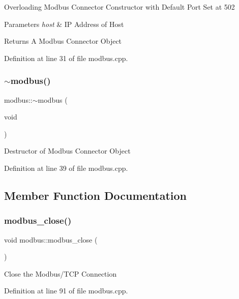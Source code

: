 Overloading Modbus Connector Constructor with Default Port Set at 502 
\begin{DoxyParams}{Parameters}
{\em host} & IP Address of Host \\
\hline
\end{DoxyParams}
\begin{DoxyReturn}{Returns}
A Modbus Connector Object 
\end{DoxyReturn}


Definition at line 31 of file modbus.\+cpp.

\mbox{\label{classmodbus_a28daaab3b7a8c838636c639d2eb14e4f}} 
\subsubsection{\texorpdfstring{$\sim$modbus()}{~modbus()}}
{\footnotesize\ttfamily modbus\+::$\sim$modbus (\begin{DoxyParamCaption}\item[{void}]{ }\end{DoxyParamCaption})}

Destructor of Modbus Connector Object 

Definition at line 39 of file modbus.\+cpp.



\subsection{Member Function Documentation}
\mbox{\label{classmodbus_a9b0db97f942a083431b5374055d4bf1b}} 
\subsubsection{\texorpdfstring{modbus\+\_\+close()}{modbus\_close()}}
{\footnotesize\ttfamily void modbus\+::modbus\+\_\+close (\begin{DoxyParamCaption}{ }\end{DoxyParamCaption})}

Close the Modbus/\+T\+CP Connection 

Definition at line 91 of file modbus.\+cpp.

\mbox{\label{classmodbus_a13709baee171c97231a33ec4edfa1051}} 
